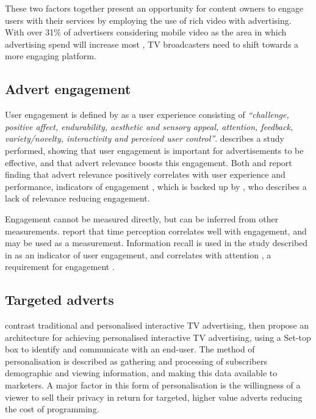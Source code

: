 		These two factors together present an opportunity for content owners to engage users with their services by employing the use of rich video with advertising. With over 31\% of advertisers considering mobile video as the area in which advertising spend will increase most \citep{brightroll-report}, TV broadcasters need to shift towards a more engaging platform.

\subsection{Advert engagement}

	User engagement is defined by \citet{what_is_engagement} as a user experience consisting of \textit{``challenge, positive affect, endurability, aesthetic and sensory appeal, attention, feedback, variety/novelty, interactivity and perceived user control''}. \citet{advertising_engagement} describes a study performed, showing that user engagement is important for advertisements to be effective, and that advert relevance boosts this engagement. Both \citet{advertising_engagement} and \citet{yahoo-intrusive-advertising} report finding that advert relevance positively correlates with user experience and performance, indicators of engagement \citep{what_is_engagement}, which is backed up by \citet{plummer2006measures}, who describes a lack of relevance reducing engagement.

	Engagement cannot be measured directly, but can be inferred from other measurements. \citet{time_perception} report that time perception correlates well with engagement, and may be used as a measurement. Information recall is used in the study described in \citep{advertising_engagement} as an indicator of user engagement, and correlates with attention \citep{interactions_attention_memory}, a requirement for engagement \cite{what_is_engagement}.

\subsection{Targeted adverts}

	\citet{personalised_interactive_tv_advertising} contrast traditional and personalised interactive TV advertising, then propose an architecture for achieving personalised interactive TV advertising, using a Set-top box to identify and communicate with an end-user. The method of personalisation is described as gathering and processing of subscribers demographic and viewing information, and making this data available to marketers. A major factor in this form of personalisation is the willingness of a viewer to sell their privacy in return for targeted, higher value adverts reducing the cost of programming.

